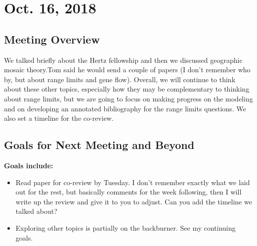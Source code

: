 \documentclass{article}
\begin{document}
\section*{Oct. 16, 2018}

\subsection*{Meeting Overview}

We talked briefly about the Hertz fellowship and then we discussed geographic mosaic theory.Tom said he would send a couple of papers (I don't remember who by, but about range limits and gene flow). Overall, we will continue to think about these other topics, especially how they may be complementary to thinking about range limits, but we are going to focus on making progress on the modeling and on developing an annotated bibliography for the range limits questions. We also set a timeline for the co-review.

\subsection*{Goals for Next Meeting and Beyond}
\textbf{Goals include:} 
\begin{itemize}
\item{Read paper for co-review by Tuesday. I don't remember exactly what we laid out for the rest, but basically comments for the week following, then I will write up the review and give it to you to adjust. Can you add the timeline we talked about?}
\item{Exploring other topics is partially on the backburner. See my continuing goals.}
\end{itemize}
\end{document}
